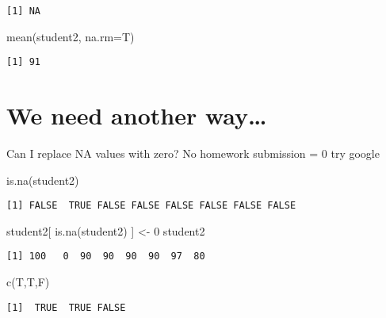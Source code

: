 \documentclass[
  letterpaper,
  DIV=11,
  numbers=noendperiod]{scrartcl}
\newenvironment{Shaded}{\begin{snugshade}}{\end{snugshade}}
\newcommand{\AttributeTok}[1]{\textcolor[rgb]{0.40,0.45,0.13}{#1}}
\newcommand{\DecValTok}[1]{\textcolor[rgb]{0.68,0.00,0.00}{#1}}
\newcommand{\FunctionTok}[1]{\textcolor[rgb]{0.28,0.35,0.67}{#1}}
\newcommand{\NormalTok}[1]{\textcolor[rgb]{0.00,0.23,0.31}{#1}}
\newcommand{\OtherTok}[1]{\textcolor[rgb]{0.00,0.23,0.31}{#1}}
\begin{document}
\begin{verbatim}
[1] NA
\end{verbatim}

\begin{Shaded}
\begin{Highlighting}[]
\FunctionTok{mean}\NormalTok{(student2, }\AttributeTok{na.rm=}\NormalTok{T)}
\end{Highlighting}
\end{Shaded}

\begin{verbatim}
[1] 91
\end{verbatim}

\hypertarget{we-need-another-way}{%
\section{We need another way\ldots{}}\label{we-need-another-way}}

Can I replace NA values with zero? No homework submission = 0 try google

\begin{Shaded}
\begin{Highlighting}[]
\FunctionTok{is.na}\NormalTok{(student2)}
\end{Highlighting}
\end{Shaded}

\begin{verbatim}
[1] FALSE  TRUE FALSE FALSE FALSE FALSE FALSE FALSE
\end{verbatim}

\begin{Shaded}
\begin{Highlighting}[]
\NormalTok{student2[ }\FunctionTok{is.na}\NormalTok{(student2) ] }\OtherTok{\textless{}{-}} \DecValTok{0}
\NormalTok{student2}
\end{Highlighting}
\end{Shaded}

\begin{verbatim}
[1] 100   0  90  90  90  90  97  80
\end{verbatim}

\begin{Shaded}
\begin{Highlighting}[]
\FunctionTok{c}\NormalTok{(T,T,F)}
\end{Highlighting}
\end{Shaded}

\begin{verbatim}
[1]  TRUE  TRUE FALSE
\end{verbatim}
\end{document}
